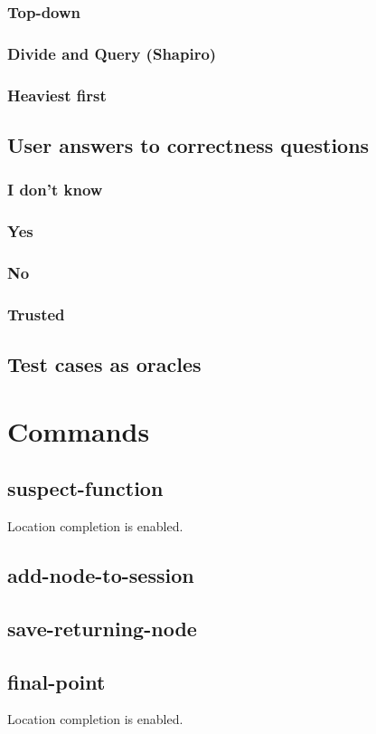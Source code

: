 \subsubsection{Top-down}
\subsubsection{Divide and Query (Shapiro)}
\subsubsection{Heaviest first}
\subsection{User answers to correctness questions}
\subsubsection{I don't know}
\subsubsection{Yes}
\subsubsection{No}
\subsubsection{Trusted}
\subsection{Test cases as oracles}
\section{Commands}
\subsection{suspect-function}
Location completion is enabled.
\subsection{add-node-to-session}
\subsection{save-returning-node}
\subsection{final-point}
Location completion is enabled.
